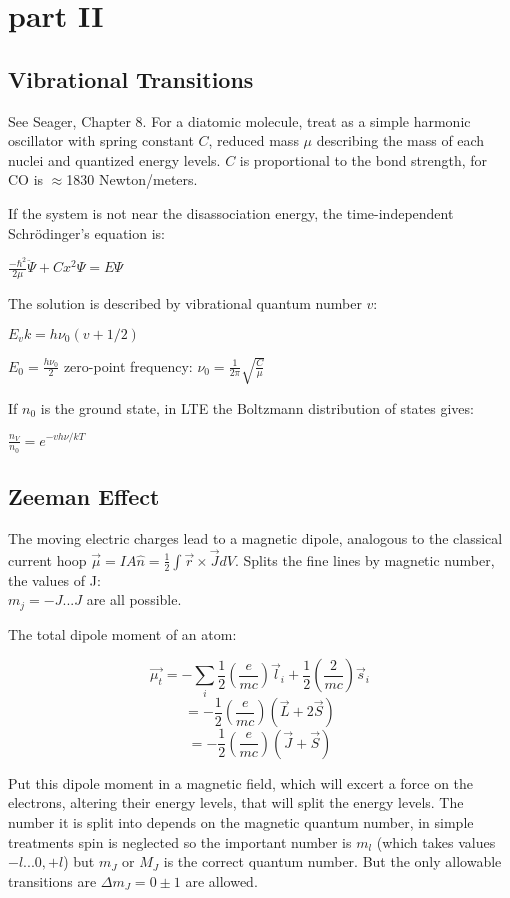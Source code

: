 \documentclass[12pt]{report}
\begin{document}
\chapter{part II}

\section{Vibrational Transitions}
See Seager, Chapter 8.
For a diatomic molecule, treat as a simple harmonic oscillator with spring constant $C$, reduced mass $\mu$ describing the mass of each nuclei and quantized energy levels. $C$ is proportional to the bond strength, for CO is $\approx$1830 Newton/meters. 

If the system is not near the disassociation energy, the time-independent Schrödinger's equation is:

\(\frac{-\hbar^2}{2\mu}\ddot{\Psi}+Cx^2\Psi=E\Psi\)

The solution  is described by vibrational quantum number $v$:

\(E_vk=h\nu_0(v+1/2)\)

\(E_0=\frac{h\nu_0}{2}\)
zero-point frequency:
\( \nu_0=\frac{1}{2\pi}\sqrt{\frac{C}{\mu}}\)


If $n_0$ is the ground state, in LTE the Boltzmann distribution of states gives:

\(\frac{n_V}{n_0}=e^{-vh\nu/kT}\)


\section{Zeeman Effect}
The moving electric charges lead to a magnetic dipole, analogous to the classical current hoop $\vec{\mu}=IA\hat{n}=\frac{1}{2}\int\vec{r}\times\vec{J} dV$.  
Splits the fine lines by magnetic number, the values of J:\\ $ m_j=-J...J$ are all possible.

The total dipole moment of an atom: 

\[\vec{\mu_{t}}=-\sum_i \frac{1}{2}(\frac{e}{mc})\vec{l}_i+\frac{1}{2}(\frac{2}{mc})\vec{s}_i\]
\[=- \frac{1}{2}(\frac{e}{mc})(\vec{L}+2\vec{S})\]
\[=-\frac{1}{2}(\frac{e}{mc})(\vec{J}+\vec{S})\]

Put this dipole moment in a magnetic field, which will excert a force on the electrons, altering their energy levels, that will split the energy levels. The number it is split into depends on the magnetic quantum number, in simple treatments spin is neglected so the important number is $m_l$ (which takes values $-l...0,+l$) but $m_J$ or $M_J$ is the correct quantum number.
But the only allowable transitions are $\Delta m_J=0\pm1$ are allowed.
\end{document}
